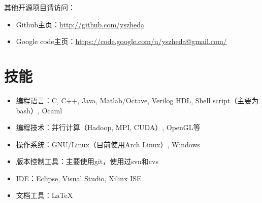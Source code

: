 \documentclass[letterpaper]{article}
\begin{document}
\begin{itemize}
\end{itemize}

其他开源项目请访问：
\begin{itemize}
  \item Github主页：\url{http://github.com/yszheda} 
  \item Google code主页：\url{https://code.google.com/u/yszheda@gmail.com/}
\end{itemize}

\section*{技能}
\begin{itemize}
\item 编程语言：C, C++, Java, Matlab/Octave, Verilog HDL, Shell script（主要为bash）, Ocaml
\item 编程技术：并行计算（Hadoop, MPI, CUDA）, OpenGL等
\item 操作系统：GNU/Linux（目前使用Arch Linux）, Windows
\item 版本控制工具：主要使用git，使用过svn和cvs
\item IDE：Eclipse, Visual Studio, Xilinx ISE
\item 文档工具：\LaTeX
\end{itemize}
\end{document}
